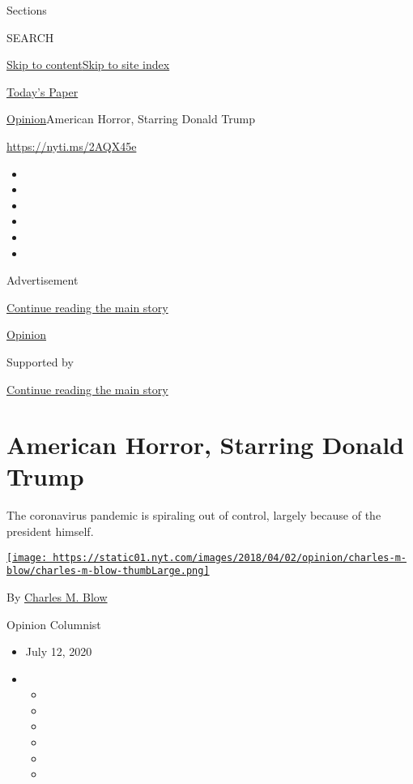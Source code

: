 Sections

SEARCH

\protect\hyperlink{site-content}{Skip to
content}\protect\hyperlink{site-index}{Skip to site index}

\href{https://myaccount.nytimes.com/auth/login?response_type=cookie\&client_id=vi}{}

\href{https://www.nytimes.com/section/todayspaper}{Today's Paper}

\href{/section/opinion}{Opinion}\textbar{}American Horror, Starring
Donald Trump

\url{https://nyti.ms/2AQX45e}

\begin{itemize}
\item
\item
\item
\item
\item
\item
\end{itemize}

Advertisement

\protect\hyperlink{after-top}{Continue reading the main story}

\href{/section/opinion}{Opinion}

Supported by

\protect\hyperlink{after-sponsor}{Continue reading the main story}

\hypertarget{american-horror-starring-donald-trump}{%
\section{American Horror, Starring Donald
Trump}\label{american-horror-starring-donald-trump}}

The coronavirus pandemic is spiraling out of control, largely because of
the president himself.

\href{https://www.nytimes.com/by/charles-m-blow}{\texttt{[image: https://static01.nyt.com/images/2018/04/02/opinion/charles-m-blow/charles-m-blow-thumbLarge.png]}}

By \href{https://www.nytimes.com/by/charles-m-blow}{Charles M. Blow}

Opinion Columnist

\begin{itemize}
\item
  July 12, 2020
\item
  \begin{itemize}
  \item
  \item
  \item
  \item
  \item
  \item
  \end{itemize}
\end{itemize}

